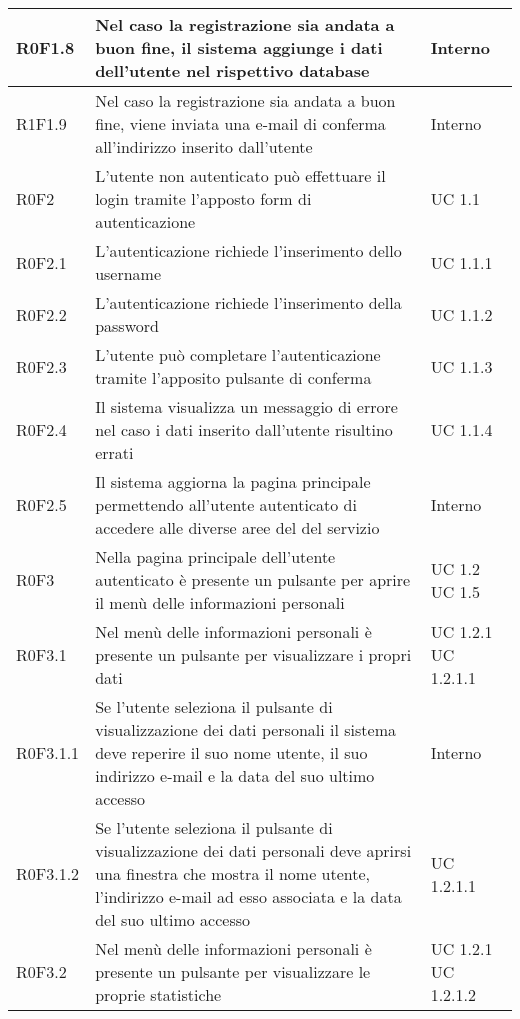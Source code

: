 \begin{center}
\begin{longtable}{| p{2cm} | p{7cm} | p{2cm} |}
		\hline
		R0F1.8  &  Nel caso la registrazione sia andata a buon fine, il sistema aggiunge i dati dell'utente nel rispettivo database  &  Interno \\
		\hline
		R1F1.9  &  Nel caso la registrazione sia andata a buon fine, viene inviata una e-mail di conferma all'indirizzo inserito dall'utente  &  Interno \\
		\hline
		R0F2  &  L'utente non autenticato può effettuare il login tramite l'apposto form di autenticazione  &  UC 1.1 \\
		\hline
		R0F2.1  &  L'autenticazione richiede l'inserimento dello username  &  UC 1.1.1 \\
		\hline
		R0F2.2  &  L'autenticazione richiede l'inserimento della password  &  UC 1.1.2 \\
		\hline
		R0F2.3  &  L'utente può completare l'autenticazione tramite l'apposito pulsante di conferma  &  UC 1.1.3 \\
		\hline
		R0F2.4  &  Il sistema visualizza un messaggio di errore nel caso i dati inserito dall'utente risultino errati  &  UC 1.1.4 \\
		\hline
		R0F2.5  &  Il sistema aggiorna la pagina principale permettendo all'utente autenticato di accedere alle diverse aree del del servizio  &  Interno  \\
		\hline
		R0F3  &  Nella pagina principale dell'utente autenticato è presente un pulsante per aprire il menù delle informazioni personali &  UC 1.2 \newline UC 1.5 \\
		\hline
		R0F3.1  &  Nel menù delle informazioni personali è presente un pulsante per visualizzare i propri dati &  UC 1.2.1 \newline UC 1.2.1.1 \\
		\hline
		R0F3.1.1  &  Se l'utente seleziona il pulsante di visualizzazione dei dati personali il sistema deve reperire il suo nome utente, il suo indirizzo e-mail e la data del suo ultimo accesso &  Interno \\
		\hline
		R0F3.1.2  &  Se l'utente seleziona il pulsante di visualizzazione dei dati personali deve aprirsi una finestra che mostra il nome utente, l'indirizzo e-mail ad esso associata e la data del suo ultimo accesso &  UC 1.2.1.1 \\
		\hline
		R0F3.2  &  Nel menù delle informazioni personali è presente un pulsante per visualizzare le proprie statistiche &  UC 1.2.1 \newline UC 1.2.1.2 \\
		\hline

\end{longtable}
\end{center}
